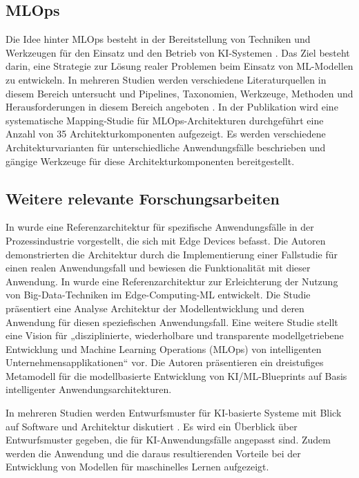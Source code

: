 \documentclass[11pt,a4paper,pointlessnumbers]{scrartcl}
\theoremstyle{break}
\numberwithin{equation}{section}
\begin{document}
\subsection{MLOps} 
Die Idee hinter MLOps besteht in der Bereitstellung von Techniken und Werkzeugen für den Einsatz und den Betrieb von KI-Systemen \cite{symeonidisMLOpsDefinitionsTools2022}. Das Ziel besteht darin, eine Strategie zur Lösung realer Problemen beim Einsatz von ML-Modellen zu entwickeln. In mehreren Studien werden verschiedene Literaturquellen in diesem Bereich untersucht und Pipelines, Taxonomien, Werkzeuge, Methoden und Herausforderungen in diesem Bereich angeboten \cite{testiMLOpsTaxonomyMethodology2022,kreuzbergerMachineLearningOperations2023,steidlPipelineContinuousDevelopment2023}. 
In der Publikation \cite{najafabadiAnalysisMLOpsArchitectures2024} wird eine systematische Mapping-Studie für MLOps-Architekturen durchgeführt eine Anzahl von 35 Architekturkomponenten aufgezeigt. Es werden verschiedene Architekturvarianten für unterschiedliche Anwendungsfälle beschrieben und gängige Werkzeuge für diese Architekturkomponenten bereitgestellt.

\subsection{Weitere relevante Forschungsarbeiten}
In \cite{wostmannConceptionReferenceArchitecture2020} wurde eine Referenzarchitektur für spezifische Anwendungsfälle in der Prozessindustrie vorgestellt, die sich mit Edge Devices befasst. Die Autoren demonstrierten die Architektur durch die Implementierung einer Fallstudie für einen realen Anwendungsfall und bewiesen die Funktionalität mit dieser Anwendung. 	
In \cite{paakkonenExtendingReferenceArchitecture2020} wurde eine Referenzarchitektur zur Erleichterung der Nutzung von Big-Data-Techniken im Edge-Computing-ML entwickelt. Die Studie präsentiert eine Analyse Architektur der Modellentwicklung und deren Anwendung für diesen speziefischen Anwendungsfall. 
Eine weitere Studie \cite{vandenheuvelModelDrivenMLOpsIntelligent2020} stellt eine Vision für „disziplinierte, wiederholbare und transparente modellgetriebene Entwicklung und Machine Learning Operations (MLOps) von intelligenten Unternehmensapplikationen“ vor. Die Autoren präsentieren ein dreistufiges Metamodell für die modellbasierte Entwicklung von KI/ML-Blueprints auf Basis intelligenter Anwendungsarchitekturen.

In mehreren Studien werden Entwurfsmuster für KI-basierte Systeme mit Blick auf Software und Architektur diskutiert \cite{heilandDesignPatternsAIbased2023,sharmaDesignPatternsMachine2019,cabralInvestigatingImpactSOLID2024,takeSoftwareDesignPatterns2021}. Es wird ein Überblick über Entwurfsmuster gegeben, die für KI-Anwendungsfälle angepasst sind. Zudem werden die Anwendung und die daraus resultierenden Vorteile bei der Entwicklung von Modellen für maschinelles Lernen aufgezeigt.
\end{document}
